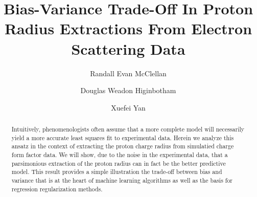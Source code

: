 \documentclass[10pt,aps,prc,twocolumn]{revtex4-1}
\begin{document}
\title{Bias-Variance Trade-Off In Proton Radius Extractions From Electron Scattering Data} 

\author{Randall Evan McClellan}
\author{Douglas Weadon Higinbotham}
\author{Xuefei Yan}

\begin{abstract}
Intuitively, phenomenologists often assume that a more complete model will necessarily yield a more 
accurate least squares fit to experimental data.   Herein we analyze this ansatz in the context of extracting 
the proton charge radius from simulatied charge form factor data.
We will show, due to the noise in the experimental data,
that a parsimonious extraction of the proton radius can in fact be the better predictive model.
This result provides a simple illustration the trade-off between bias and variance that is at the
heart of machine learning algorithms as well as the basis for regression regularization methods.
\end{abstract}

%
%
%
%
%
%
%
%
%
%
%
\end{document}
